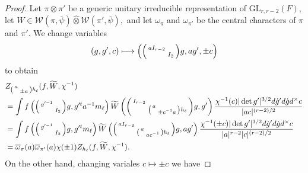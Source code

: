 \documentclass[12pt]{amsart}
\theoremstyle{remark}
\numberwithin{equation}{section}
\newcommand{\GL}{\mathrm{GL}}
\theoremstyle{definition}
\newenvironment{psmatrix}
  {\left(\begin{smallmatrix}}
  {\end{smallmatrix}\right)}
\renewcommand{\bar}{\overline}
\numberwithin{equation}{subsection}
\begin{document}
{\begin{proof}
Let $\pi \otimes \pi'$ be a generic unitary irreducible representation of $\GL_{r,r-2}(F),$ let $W\in \mathcal{W}(\pi,\bar{\psi})\widehat{\otimes}\mathcal{W}(\pi',\overline{\psi}),$ and let $\omega_{\pi}$ and $\omega_{\pi'}$ be the central characters of $\pi$ and $\pi'.$
 We change variables
$$
(g,g',c)\longmapsto \left(\begin{psmatrix} aI_{r-2} & \\ &  I_2\end{psmatrix} g,ag',\pm c\right)
$$
to obtain
\begin{align}  \label{a:for:later}\begin{split}
&Z_{\begin{psmatrix} a & \\ & \pm a \end{psmatrix}h_\ell}(f,\widetilde{W},\chi^{-1})\\
&=\int f\left(\begin{psmatrix}
    g'^{-1} &\\
     & I_2
\end{psmatrix}g,g'^t a^{-1}m_{\ell} \right)
\widetilde{W}\left(\begin{psmatrix} I_{r-2} &  \\ & \begin{psmatrix} a & \\ & \pm c^{-1}a\end{psmatrix}h_\ell \end{psmatrix}g,g'\right) \frac{\chi^{-1}( c)|\det g'|^{3/2}d\dot{g}'d\dot{g}d^\times c}{|ac|^{(r-2)/2}}\\
&=\int f\left(\begin{psmatrix}
    g'^{-1} &\\
     & I_2
\end{psmatrix}g,g'^t m_{\ell} \right)
\widetilde{W}\left(\begin{psmatrix} aI_{r-2} &  \\ & \begin{psmatrix} a & \\ & ac^{-1}\end{psmatrix}h_\ell \end{psmatrix}g,ag'\right) \frac{\chi^{-1}(\pm c)|\det g'|^{3/2}d\dot{g}'d\dot{g}d^\times c}{|a|^{r-2}|c|^{(r-2)/2}}\\
&=\overline{\omega}_{\pi}(a)\overline{\omega}_{\pi'}(a)\chi(\pm 1)
Z_{h_\ell }(f,\widetilde{W},\chi^{-1}). \end{split}
\end{align}
On the other hand, changing variales $c \mapsto \pm c$ we have

\end{proof}}
\end{document}
